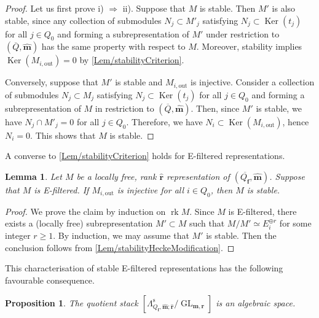 \documentclass[a4paper,12pt]{article}
\theoremstyle{definition}
\theoremstyle{plain}
\newtheorem{proposition}[definition]{Proposition}
\newtheorem{lemma}[definition]{Lemma}
\theoremstyle{remark}
\DeclareMathOperator{\Ker}{Ker}
\DeclareMathOperator{\GL}{GL}
\DeclareMathOperator{\rk}{rk}
\newcommand{\st}{\mathrm{s}}
\newcommand\bff{\mathbf{f}}
\newcommand\bfm{\mathbf{m}}
\newcommand\bfr{\mathbf{r}}
\begin{document}
\begin{proof}
Let us first prove i) $\Rightarrow$ ii). Suppose that $M$ is stable. Then $M'$ is also stable, since any collection of submodules $N_j\subset M'_j$ satisfying $N_j\subset\Ker(t_j)$ for all $j\in Q_0$ and forming a subrepresentation of $M'$ under restriction to $(\overline{Q},\widehat{\bfm})$ has the same property with respect to $M$. Moreover, stability implies $\Ker(M_{i,\mathrm{out}})=0$ by \cref{Lem/stabilityCriterion}.

Conversely, suppose that $M'$ is stable and $M_{i,\mathrm{out}}$ is injective. Consider a collection of submodules $N_j\subset M_j$ satisfying $N_j\subset\Ker(t_j)$ for all $j\in Q_0$ and forming a subrepresentation of $M$ in restriction to $(\overline{Q},\widehat{\bfm})$. Then, since $M'$ is stable, we have $N_j\cap M'_j=0$ for all $j\in Q_0$. Therefore, we have $N_i\subset\Ker(M_{i,\mathrm{out}})$, hence $N_i=0$. This shows that $M$ is stable.
\end{proof}

A converse to \cref{Lem/stabilityCriterion} holds for E-filtered representations.

\begin{lemma}\label{Lem/nilpotentStabilityCondition}
Let $M$ be a locally free, rank $\widehat{\bfr}$ representation of $(\overline{Q_\bff},\widehat{\bfm})$. Suppose that $M$ is E-filtered. If $M_{i,\mathrm{out}}$ is injective for all $i\in Q_0$, then $M$ is stable.
\end{lemma}

\begin{proof}
We prove the claim by induction on $\rk M$. Since $M$ is E-filtered, there exists a (locally free) subrepresentation $M'\subset M$ such that $M/M'\simeq E_i^{\oplus r}$ for some integer $r\geq1$. By induction, we may assume that $M'$ is stable. Then the conclusion follows from \cref{Lem/stabilityHeckeModification}.\end{proof}

This characterisation of stable E-filtered representations has the following favourable consequence.

\begin{proposition}\label{Prop/trivialStabilisers}
The quotient stack $\left[\Lambda_{Q_\bff,\widehat{\bfm};\widehat{\bfr}}^\st/\GL_{\bfm,\bfr}\right]$ is an algebraic space.
\end{proposition}
\end{document}
